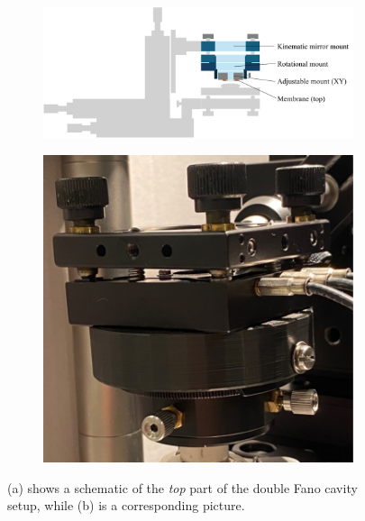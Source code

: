 \begin{figure}[h!]
    \centering
    \begin{subfigure}[b]{0.6\textwidth}
        \includegraphics[width=\textwidth]{figures/setup_top.pdf}
        \caption{}
        \label{fig:setup_top}
    \end{subfigure}
    \begin{subfigure}[b]{0.3\textwidth}
        \includegraphics[width=\textwidth]{figures/setup_top_pic.pdf}
        \caption{}
        \label{fig:setup_top_pic}
    \end{subfigure}
    \caption{(a) shows a schematic of the \emph{top} part of the double Fano cavity setup, while (b) is a corresponding picture.}
    \label{fig:setup_top_sketch_and_pic}
\end{figure} 

